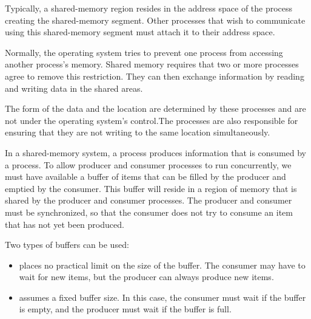     \par Typically, a shared-memory region resides in the address space of the process creating the shared-memory segment. Other processes that wish to communicate using this shared-memory segment must attach it to their address space.
    \par Normally, the operating system tries to prevent one process from accessing another process’s memory. Shared memory requires that two or more processes agree to remove this restriction. They can then exchange information by reading and writing data in the shared areas.
    \par The form of the data and the location are determined by these processes and are not under the operating system’s control.The processes are also responsible for ensuring that they are not writing to the same location simultaneously.
    \par In a shared-memory system, a  process produces information that is consumed by a  process. To allow producer and consumer processes to run concurrently, we must have available a buffer of items that can be filled by the producer and emptied by the consumer. This buffer will reside in a region of memory that is shared by the producer and consumer processes.  The producer and consumer must be synchronized, so that the consumer does not try to consume an item that has not yet been produced.
    \par Two types of buffers can be used:
    \begin{itemize}
      \item {} places no practical limit on the size of the buffer. The consumer may have to wait for new items, but the producer can always produce new items.
      \item {} assumes a fixed buffer size. In this case, the consumer must wait if the buffer is empty, and the producer must wait if the buffer is full.
    \end{itemize}

